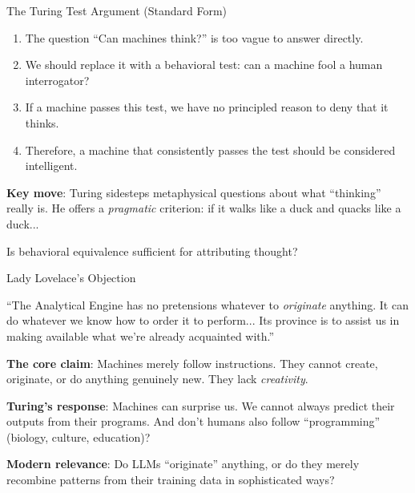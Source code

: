 ﻿\documentclass[aspectratio=169,11pt]{beamer}
\begin{document}
\begin{frame}{The Turing Test Argument (Standard Form)}
\begin{probox}
\small
\begin{enumerate}
    \item The question ``Can machines think?'' is too vague to answer directly.
    \item We should replace it with a behavioral test: can a machine fool a human interrogator?
    \item If a machine passes this test, we have no principled reason to deny that it thinks.
    \item Therefore, a machine that consistently passes the test should be considered intelligent.
\end{enumerate}
\end{probox}

\vspace{0.1em}
\textbf{Key move}: Turing sidesteps metaphysical questions about what ``thinking'' really is. He offers a \emph{pragmatic} criterion: if it walks like a duck and quacks like a duck...

\vspace{0.1em}
\begin{discussionbox}[Discussion]
Is behavioral equivalence sufficient for attributing thought?
\end{discussionbox}
\end{frame}

\begin{frame}{Lady Lovelace's Objection}
\begin{casestudybox}
\small
``The Analytical Engine has no pretensions whatever to \emph{originate} anything. It can do whatever we know how to order it to perform... Its province is to assist us in making available what we're already acquainted with.''
\end{casestudybox}

\vspace{0.3em}
\textbf{The core claim}: Machines merely follow instructions. They cannot create, originate, or do anything genuinely new. They lack \emph{creativity}.

\vspace{0.3em}
\textbf{Turing's response}: Machines can surprise us. We cannot always predict their outputs from their programs. And don't humans also follow ``programming'' (biology, culture, education)?

\vspace{0.3em}
\textbf{Modern relevance}: Do LLMs ``originate'' anything, or do they merely recombine patterns from their training data in sophisticated ways?
\end{frame}
\end{document}
